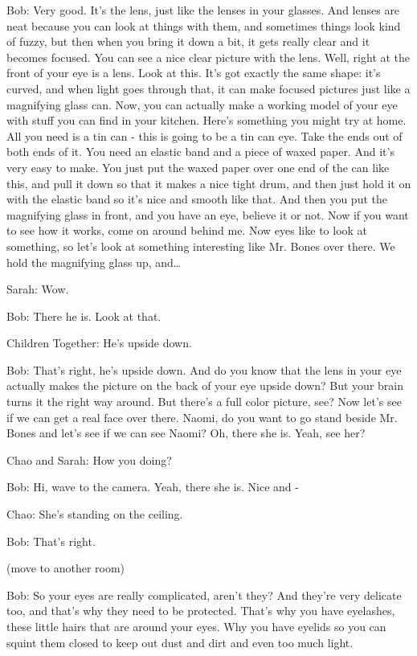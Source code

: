 Bob: Very good. It's the lens, just like the lenses in your glasses. And lenses are neat because you can look at things with them, and sometimes things look kind of fuzzy, but then when you bring it down a bit, it gets really clear and it becomes focused. You can see a nice clear picture with the lens. Well, right at the front of your eye is a lens. Look at this. It's got exactly the same shape: it's curved, and when light goes through that, it can make focused pictures just like a magnifying glass can. Now, you can actually make a working model of your eye with stuff you can find in your kitchen. Here's something you might try at home. All you need is a tin can - this is going to be a tin can eye. Take the ends out of both ends of it. You need an elastic band and a piece of waxed paper. And it's very easy to make. You just put the waxed paper over one end of the can like this, and pull it down so that it makes a nice tight drum, and then just hold it on with the elastic band so it's nice and smooth like that. And then you put the magnifying glass in front, and you have an eye, believe it or not. Now if you want to see how it works, come on around behind me. Now eyes like to look at something, so let's look at something interesting like Mr. Bones over there. We hold the magnifying glass up, and\dots

Sarah: Wow.

Bob: There he is. Look at that.

Children Together: He's upside down.

Bob: That's right, he's upside down. And do you know that the lens in your eye actually makes the picture on the back of your eye upside down? But your brain turns it the right way around. But there's a full color picture, see? Now let's see if we can get a real face over there. Naomi, do you want to go stand beside Mr. Bones and let's see if we can see Naomi? Oh, there she is. Yeah, see her?

Chao and Sarah: How you doing?

Bob: Hi, wave to the camera. Yeah, there she is. Nice and -

Chao: She's standing on the ceiling.

Bob: That's right.

(move to another room)

Bob: So your eyes are really complicated, aren't they? And they're very delicate too, and that's why they need to be protected. That's why you have eyelashes, these little hairs that are around your eyes. Why you have eyelids so you can squint them closed to keep out dust and dirt and even too much light.

